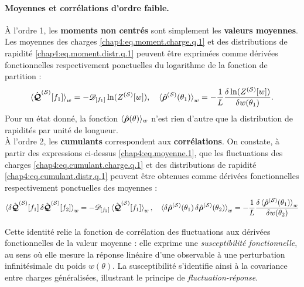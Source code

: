 \paragraph{Moyennes et corrélations d’ordre faible.}
À l’ordre 1, les {\bf moments non centrés} sont simplement les {\bf valeurs moyennes}. Les moyennes des charges \eqref{chap4:eq.moment.charge.q.1} et des distributions de rapidité \eqref{chap4:eq.moment.distr.q.1} peuvent être exprimées comme dérivées fonctionnelles respectivement ponctuelles  du logarithme de la fonction de partition :
\begin{eqnarray}\label{chap4:eq.moyenne.1}
	\braket{\hat{\bm{\mathcal{Q}}}^{(\mathcal{S})}[f_1]}_w   =  - \mathscr{D}_{[f_1]}  \ln(Z^{(\mathcal{S})}[w]), \quad \braket{\hat{\bm{\rho}}^{(\mathcal{S})}(\theta_1)}_w   =  - \frac{1}{L}\frac{\delta \ln(Z^{(\mathcal{S})}[w])}{\delta w(\theta_1)} .
\end{eqnarray}
Pour un état donné, la fonction $\langle \hat{\bm{\rho}}(\theta) \rangle_w$ n’est rien d’autre que la distribution de rapidités par unité de longueur.\\

À l’ordre 2, les {\bf cumulants}  correspondent aux {\bf corrélations}. On constate, à partir des expressions ci-dessus \eqref{chap4:eq.moyenne.1}, que les fluctuations des charges \eqref{chap4:eq.cumulant.charge.q.1} et des distributions de rapidité \eqref{chap4:eq.cumulant.distr.q.1} peuvent être obtenues comme dérivées fonctionnelles respectivement ponctuelles des moyennes :
\begin{eqnarray}\label{chap4:eq.susceptibilite-fonctionnelle}
	\braket{\delta\hat{\bm{\mathcal{Q}}}^{(\mathcal{S})}[f_1] \, \delta \hat{\bm{\mathcal{Q}}}^{(\mathcal{S})}[f_2]}_w   =  - \mathscr{D}_{[f_2]}  \braket{\hat{\bm{\mathcal{Q}}}^{(\mathcal{S})}[f_1]}_w, \quad \braket{\delta\hat{\bm{\rho}}^{(\mathcal{S})}(\theta_1)\, \delta\hat{\bm{\rho}}^{(\mathcal{S})}(\theta_2)}_w   =  - \frac{1}{L} \frac{\delta  \braket{\hat{\bm{\rho}}^{(\mathcal{S})}(\theta_1)}_w }{\delta w(\theta_2)}	
\end{eqnarray}

Cette identité relie la fonction de corrélation des fluctuations aux dérivées fonctionnelles de la valeur moyenne : elle exprime une \emph{susceptibilité fonctionnelle}, au sens où elle mesure la réponse linéaire d'une observable à une perturbation infinitésimale du poids $w(\theta)$. La susceptibilité s'identifie ainsi à la covariance entre charges généralisées, illustrant le principe de \emph{fluctuation-réponse}.



